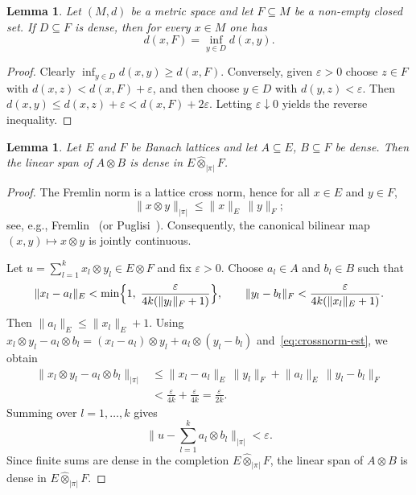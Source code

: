\documentclass[12pt]{amsart}
\renewcommand{\le}{\leqslant}
\renewcommand{\ge}{\geqslant}
\theoremstyle{plain}
\newtheorem{lemma}[theorem]{Lemma}
\theoremstyle{definition}
\theoremstyle{remark}
\begin{document}
\begin{lemma}\label{lem:dist-dense}
Let $(M, d)$ be a metric space and let $F \subseteq M$ be a non-empty closed set.
If $D \subseteq F$ is dense, then for every $x \in M$ one has
\[
    d(x, F) = \inf_{y \in D} d(x, y).
\]
\end{lemma}

\begin{proof}
Clearly $\inf_{y \in D} d(x, y) \ge d(x, F)$.  Conversely, given
$\varepsilon > 0$ choose $z \in F$ with $d(x, z) < d(x, F) + \varepsilon$,
and then choose $y \in D$ with $d(y, z) < \varepsilon$.  Then
$d(x, y) \le d(x, z) + \varepsilon < d(x, F) + 2\varepsilon$.
Letting $\varepsilon \downarrow 0$ yields the reverse inequality.
\end{proof}

\begin{lemma}\label{lem:dense-tensor}
Let $E$ and $F$ be Banach lattices and let $A \subseteq E$, $B \subseteq F$
be dense.  Then the linear span of $A \otimes B$ is dense in
$E \hat{\otimes}_{|\pi|} F$.
\end{lemma}

\begin{proof}
The Fremlin norm is a lattice cross norm, hence for all $x \in E$ and $y \in F$,
\begin{equation}\label{eq:crossnorm-est}
    \lVert x \otimes y \rVert_{|\pi|}
    \le \lVert x \rVert_E \, \lVert y \rVert_F;
\end{equation}
see, e.g., Fremlin~\cite{Frem1974Ban} (or Puglisi~\cite{Pug2007Fremlin}).
Consequently, the canonical bilinear map $(x, y) \mapsto x \otimes y$ is jointly
continuous.

Let $u = \sum_{l=1}^k x_l \otimes y_l \in E \otimes F$ and fix
$\varepsilon > 0$.  Choose $a_l \in A$ and $b_l \in B$ such that
\[
    \lVert x_l - a_l \rVert_E
    < \min\Bigl\{1,\;\frac{\varepsilon}{4k(\lVert y_l \rVert_F + 1)}\Bigr\},
    \qquad
    \lVert y_l - b_l \rVert_F
    < \frac{\varepsilon}{4k(\lVert x_l \rVert_E + 1)}.
\]
Then $\lVert a_l \rVert_E \le \lVert x_l \rVert_E + 1$.  Using
$x_l \otimes y_l - a_l \otimes b_l
= (x_l - a_l) \otimes y_l + a_l \otimes (y_l - b_l)$
and~\eqref{eq:crossnorm-est}, we obtain
\[
\begin{aligned}
    \lVert x_l \otimes y_l - a_l \otimes b_l \rVert_{|\pi|}
    &\le \lVert x_l - a_l \rVert_E \, \lVert y_l \rVert_F
       + \lVert a_l \rVert_E \, \lVert y_l - b_l \rVert_F \\
    &< \frac{\varepsilon}{4k} + \frac{\varepsilon}{4k}
    = \frac{\varepsilon}{2k}.
\end{aligned}
\]
Summing over $l = 1, \ldots, k$ gives
\[
    \biggl\lVert u - \sum_{l=1}^k a_l \otimes b_l \biggr\rVert_{|\pi|}
    < \varepsilon.
\]
Since finite sums are dense in the completion $E \hat{\otimes}_{|\pi|} F$, the
linear span of $A \otimes B$ is dense in $E \hat{\otimes}_{|\pi|} F$.
\end{proof}
\end{document}
